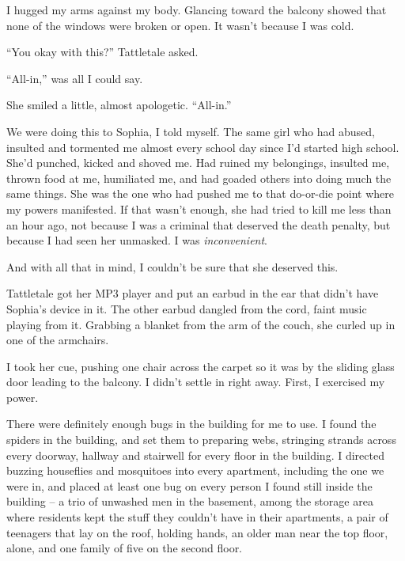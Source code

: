I hugged my arms against my body.  Glancing toward the balcony showed that none of the windows were broken or open.  It wasn't because I was cold.



``You okay with this?'' Tattletale asked.



``All-in,'' was all I could say.



She smiled a little, almost apologetic. ``All-in.''



We were doing this to Sophia, I told myself.  The same girl who had abused, insulted and tormented me almost every school day since I'd started high school.  She'd punched, kicked and shoved me.  Had ruined my belongings, insulted me, thrown food at me, humiliated me, and had goaded others into doing much the same things.  She was the one who had pushed me to that do-or-die point where my powers manifested.  If that wasn't enough, she had tried to kill me less than an hour ago, not because I was a criminal that deserved the death penalty, but because I had seen her unmasked.  I was \emph{inconvenient}.



And with all that in mind, I couldn't be sure that she deserved this.



Tattletale got her MP3 player and put an earbud in the ear that didn't have Sophia's device in it.  The other earbud dangled from the cord, faint music playing from it.  Grabbing a blanket from the arm of the couch, she curled up in one of the armchairs.



I took her cue, pushing one chair across the carpet so it was by the sliding glass door leading to the balcony.  I didn't settle in right away.  First, I exercised my power.



There were definitely enough bugs in the building for me to use.  I found the spiders in the building, and set them to preparing webs, stringing strands across every doorway, hallway and stairwell for every floor in the building.  I directed buzzing houseflies and mosquitoes into every apartment, including the one we were in, and placed at least one bug on every person I found still inside the building – a trio of unwashed men in the basement, among the storage area where residents kept the stuff they couldn't have in their apartments, a pair of teenagers that lay on the roof, holding hands, an older man near the top floor, alone, and one family of five on the second floor.




